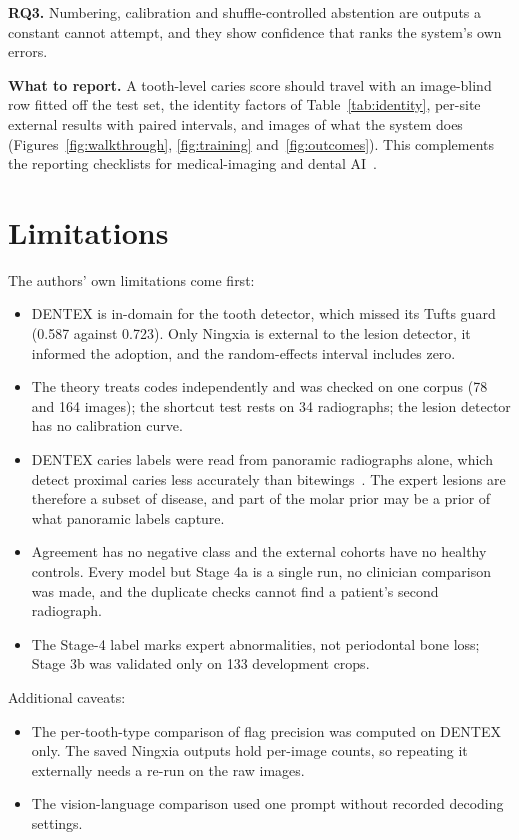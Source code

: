 \textbf{RQ3.} Numbering, calibration and shuffle-controlled abstention are outputs a constant cannot
attempt, and they show confidence that ranks the system's own errors.

\textbf{What to report.} A tooth-level caries score should travel with an image-blind row fitted off the
test set, the identity factors of Table~\ref{tab:identity}, per-site external results with paired
intervals, and images of what the system does (Figures~\ref{fig:walkthrough}, \ref{fig:training}
and~\ref{fig:outcomes}). This complements the reporting checklists for medical-imaging and dental
AI~\cite{mongan2020claim,schwendicke2021checklist}. %

\section{Limitations}
\label{sec:limitations}

The authors' own limitations come first:
\begin{itemize}
\item DENTEX is in-domain for the tooth detector, which missed its Tufts guard (0.587 against 0.723).
  Only Ningxia is external to the lesion detector, it informed the adoption, and the random-effects
  interval includes zero. %
\item The theory treats codes independently and was checked on one corpus (78 and 164 images); the
  shortcut test rests on 34 radiographs; the lesion detector has no calibration curve. %
\item DENTEX caries labels were read from panoramic radiographs alone, which detect proximal caries less
  accurately than bitewings~\cite{akarslan2008comparison}. The expert lesions are therefore a subset of
  disease, and part of the molar prior may be a prior of what panoramic labels capture. %
\item Agreement has no negative class and the external cohorts have no healthy controls. Every model but
  Stage 4a is a single run, no clinician comparison was made, and the duplicate checks cannot find a
  patient's second radiograph. %
\item The Stage-4 label marks expert abnormalities, not periodontal bone loss; Stage 3b was validated
  only on 133 development crops. %
\end{itemize}

Additional caveats:
\begin{itemize}
\item The per-tooth-type comparison of flag precision was computed on DENTEX only. The saved Ningxia
  outputs hold per-image counts, so repeating it externally needs a re-run on the raw images.
\item The vision-language comparison used one prompt without recorded decoding settings.
\end{itemize}
